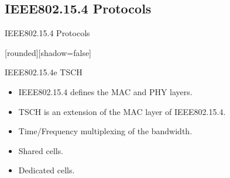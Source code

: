 \subsection{IEEE802.15.4 Protocols}
\begin{withoutheadline}
\begin{frame}{IEEE802.15.4 Protocols}

[rounded][shadow=false]

\begin{block}{IEEE802.15.4e TSCH}
    \begin{itemize}
    \item  IEEE802.15.4 defines the MAC and PHY layers. 
    \item<2->  TSCH is an extension of the MAC layer of IEEE802.15.4.
    \item<3->  Time/Frequency multiplexing of the bandwidth.
    \item<4-> Shared cells.
    \item<5-> Dedicated cells.
    \end{itemize}
    \end{block}

\begin{figure}[p]


\end{figure}
\end{frame}
\end{withoutheadline}
